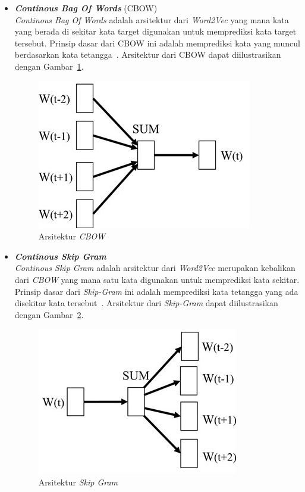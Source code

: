 \begin{itemize}
      \item \emph{\bfseries Continous Bag Of Words} (CBOW)\\
      \emph{Continous Bag Of Words} adalah arsitektur dari \emph{Word2Vec} yang mana kata yang
      berada di sekitar kata target digunakan untuk memprediksi kata target tersebut. Prinsip
      dasar dari CBOW ini adalah memprediksi kata yang muncul berdasarkan kata
tetangga~\citep{Jang2019}. Arsitektur dari CBOW dapat diilustrasikan dengan Gambar~\ref{fig:cbow_Word2Vec}.

      \begin{figure}[H]
            \centering
            \includegraphics[scale=0.7]{assets/cbow_Word2Vec.jpg}
            \caption{Arsitektur \emph{CBOW}~\citep{Jang2019}}
            \label{fig:cbow_Word2Vec}
      \end{figure}

      \item \emph{\bfseries Continous Skip Gram}\\
      \emph{Continous Skip Gram} adalah arsitektur dari \emph{Word2Vec} merupakan kebalikan dari
      \emph{CBOW} yang mana satu kata digunakan untuk memprediksi kata sekitar. Prinsip dasar dari
      \emph{Skip-Gram} ini adalah memprediksi kata tetangga yang ada disekitar kata
      tersebut~\citep{Jang2019}. Arsitektur dari \emph{Skip-Gram} dapat diilustrasikan dengan
Gambar~\ref{fig:skip_gram_Word2Vec}.

      \begin{figure}[H]
            \centering
            \includegraphics[scale=0.7]{assets/skipgram_Word2Vec.jpg}
            \caption{Arsitektur \emph{Skip Gram}~\citep{Jang2019}}
            \label{fig:skip_gram_Word2Vec}
      \end{figure}
      
\end{itemize}

